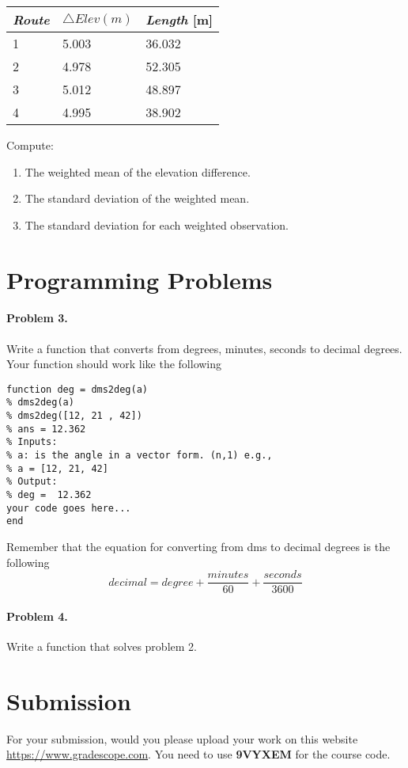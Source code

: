 \documentclass[]{scrartcl}
\begin{document}
\begin{table}[]
	\centering
	\label{table:table-2}
	\begin{tabular}{@{}lll@{}}
		\toprule
		\emph{Route} & $\triangle Elev (m)$ & \emph{Length} [m]\\
		\midrule
		1 & 5.003 & 36.032\\
		2 & 4.978 & 52.305\\
		3 & 5.012 & 48.897\\
		4 & 4.995 & 38.902\\
		\bottomrule
	\end{tabular}
\end{table}

Compute:
\begin{enumerate}
	\item The weighted mean of the elevation difference.
	\item The standard deviation of the weighted mean.
	\item The standard deviation for each weighted observation.
\end{enumerate}

\section{Programming Problems}

\paragraph{Problem 3.}Write a function that converts from degrees, minutes, seconds to decimal degrees. Your function should work like the following

\begin{verbatim}
function deg = dms2deg(a)
% dms2deg(a)
% dms2deg([12, 21 , 42])
% ans = 12.362
% Inputs:
% a: is the angle in a vector form. (n,1) e.g., 
% a = [12, 21, 42]
% Output:
% deg =  12.362
your code goes here...
end
\end{verbatim}

Remember that the equation for converting from dms to decimal degrees is the following
\begin{equation}
	decimal = degree + \frac{minutes}{60} + \frac{seconds}{3600}
\end{equation}
\paragraph{Problem 4.} Write a function that solves problem 2.

\section{Submission}
For your submission, would you please upload your work on this website \href{https://www.gradescope.com}{https://www.gradescope.com}. You need to use \textbf{9VYXEM} for the course code.
\end{document}

